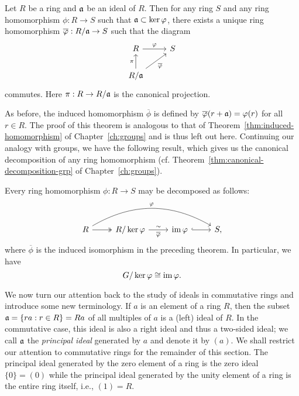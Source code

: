 \begin{theorem}
    \label{thm:ideal-universal-property}
    Let \(R\) be a ring and \(\mathfrak{a}\) be an ideal of \(R\). Then for any ring
    \(S\) and any ring homomorphism \(\phi: R \to S\) such that \(\mathfrak{a}
    \subset \ker \varphi\), there exists a unique ring homomorphism
    \(\overline{\varphi}: R/\mathfrak{a} \to S\) such that the diagram
    \[
        \begin{tikzcd}
            R \ar[r, "\phi"] & S\\
            R/\idl{a} \ar[u, "\pi"] \ar[ur, "\overline{\phi}"']
        \end{tikzcd}
    \]
    commutes. Here \(\pi: R \to R/\mathfrak{a}\) is the canonical projection.
\end{theorem}

As before, the induced homomorphism \(\overline{\phi}\) is defined by
\(\overline{\varphi}(r + \mathfrak{a}) = \varphi(r)\) for all \(r \in R\). The proof of
this theorem is analogous to that of Theorem~\ref{thm:induced-homomorphism} of
Chapter~\ref{ch:groups} and is thus left out here. Continuing our analogy with
groups, we have the following result, which gives us the canonical decomposition
of any ring homomorphism (cf. Theorem~\ref{thm:canonical-decomposition-grp} of
Chapter~\ref{ch:groups}).

\begin{theorem}
    \label{thm:canonical-decomposition-ring}
    Every ring homomorphism \(\phi: R \to S\) may be decomposed as follows:
    \[
        \begin{tikzcd}
            R \arrow[r, two heads] \arrow[rrr, bend left, "\phi"]   & R/\ker\phi \arrow[r,"\sim" above, "\overline{\phi}" below]   & \img\phi \arrow[r, hook]  & S,
        \end{tikzcd}
    \]
    where \(\overline{\phi}\) is the induced isomorphism in the preceding
    theorem. In particular, we have
    \[
        G/\ker\varphi \cong \operatorname{im}\varphi.
    \]
\end{theorem}

\bigskip

We now turn our attention back to the study of ideals in commutative rings and
introduce some new terminology. If \(a\) is an element of a ring \(R\), then the
subset \(\mathfrak{a} = \{ra : r \in R\} = Ra\) of all multiples of \(a\) is a (left)
ideal of \(R\). In the commutative case, this ideal is also a right ideal and
thus a two-sided ideal; we call \(\mathfrak{a}\) the \emph{principal ideal} generated
by \(a\) and denote it by \((a)\). We shall restrict our attention to
commutative rings for the remainder of this section. The principal ideal
generated by the zero element of a ring is the zero ideal \(\{0\} = (0)\) while
the principal ideal generated by the unity element of a ring is the entire ring
itself, i.e., \((1) = R\).

